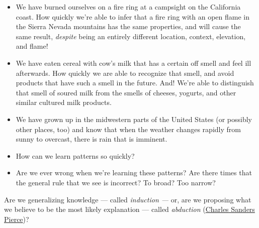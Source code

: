 \documentclass[
  letterpaper,
  DIV=11,
  numbers=noendperiod]{scrreprt}
\begin{document}
\begin{itemize}
\item
  We have burned ourselves on a fire ring at a campsight on the
  California coast. How quickly we're able to infer that a fire ring
  with an open flame in the Sierra Nevada mountains has the same
  properties, and will cause the same result, \emph{despite} being an
  entirely different location, context, elevation, and flame!
\item
  We have eaten cereal with cow's milk that has a certain off smell and
  feel ill afterwards. How quickly we are able to recognize that smell,
  and avoid products that have such a smell in the future. And! We're
  able to distinguish that smell of soured milk from the smells of
  cheeses, yogurts, and other similar cultured milk products.
\item
  We have grown up in the midwestern parts of the United States (or
  possibly other places, too) and know that when the weather changes
  rapidly from sunny to overcast, there is rain that is imminent.
\end{itemize}

\begin{tcolorbox}[enhanced jigsaw, titlerule=0mm, colback=white, toptitle=1mm, toprule=.15mm, bottomtitle=1mm, colframe=quarto-callout-note-color-frame, colbacktitle=quarto-callout-note-color!10!white, bottomrule=.15mm, leftrule=.75mm, opacityback=0, title=\textcolor{quarto-callout-note-color}{\faInfo}\hspace{0.5em}{Pattern Learning}, opacitybacktitle=0.6, arc=.35mm, rightrule=.15mm, breakable, coltitle=black, left=2mm]

\begin{itemize}
\item
  How can we learn patterns so quickly?
\item
  Are we ever wrong when we're learning these patterns? Are there times
  that the general rule that we see is incorrect? To broad? Too narrow?
\end{itemize}

\end{tcolorbox}

Are we generalizing knowledge --- called \emph{induction ---} or, are we
proposing what we believe to be the most likely explanation --- called
\emph{abduction}
(\href{https://plato.stanford.edu/entries/peirce/}{Charles Sanders
Pierce})?
\end{document}
